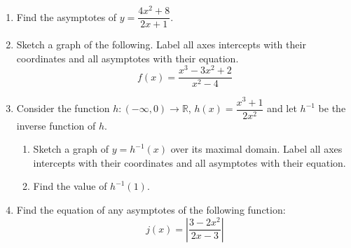 \documentclass[12pt]{article}
\begin{document}
\begin{enumerate}
    \item Find the asymptotes of $y = \dfrac{4x^2+8}{2x+1}$.
    \vfill
    
    \item Sketch a graph of the following. Label all axes intercepts with their coordinates and all asymptotes with their equation.
    \[ f(x) = \frac{x^3 - 3x^2 + 2}{x^2 - 4} \]
    \vfill
    
    \item Consider the function $h: (-\infty, 0) \to \mathbb{R}$, $h(x) = \dfrac{x^3+1}{2x^2}$ and let $h^{-1}$ be the inverse function of $h$.
    \begin{enumerate}
        \item Sketch a graph of $y = h^{-1}(x)$ over its maximal domain. Label all axes intercepts with their coordinates and all asymptotes with their equation.
        \vfill
        \item Find the value of $h^{-1}(1)$.
        \vfill
    \end{enumerate}
    
    \item Find the equation of any asymptotes of the following function:
    \[ j(x) = \left| \frac{3-2x^2}{2x-3} \right| \]
    \vfill
\end{enumerate}
\end{document}
